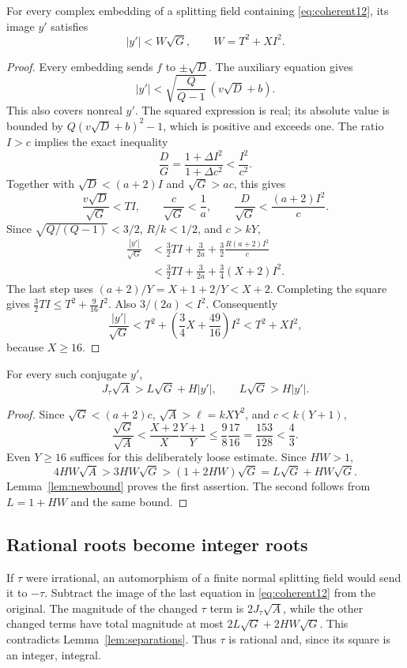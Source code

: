 \begin{lemma}
\label{lem:newbound}
For every complex embedding of a splitting field containing
\eqref{eq:coherent12}, its image $y'$ satisfies
\[
 |y'|<W\sqrt G,\qquad W=T^2+XI^2.
\]
\end{lemma}
\begin{proof}
Every embedding sends $f$ to $\pm\sqrt D$. The auxiliary equation gives
\[
 |y'|<\sqrt{\frac{Q}{Q-1}}\,(v\sqrt D+b).
\]
This also covers nonreal $y'$. The squared expression is real; its absolute
value is bounded by $Q(v\sqrt D+b)^2-1$, which is positive and exceeds one.
The ratio $I>c$ implies the exact inequality
\[
 \frac DG=\frac{1+\Delta I^2}{1+\Delta c^2}<\frac{I^2}{c^2}.
\]
Together with $\sqrt D<(a+2)I$ and $\sqrt G>ac$, this gives
\[
 \frac{v\sqrt D}{\sqrt G}<TI,\qquad
 \frac c{\sqrt G}<\frac1a,\qquad
 \frac D{\sqrt G}<\frac{(a+2)I^2}{c}.
\]
Since $\sqrt{Q/(Q-1)}<3/2$, $R/k<1/2$, and $c>kY$,
\begin{align*}
 \frac{|y'|}{\sqrt G}
 &<\frac32TI+\frac3{2a}+\frac32\frac{R(a+2)I^2}{c}\\
 &<\frac32TI+\frac3{2a}+\frac34(X+2)I^2.
\end{align*}
The last step uses $(a+2)/Y=X+1+2/Y<X+2$. Completing the square gives
$\frac32TI\le T^2+\frac9{16}I^2$. Also $3/(2a)<I^2$. Consequently
\[
 \frac{|y'|}{\sqrt G}
 <T^2+\left(\frac34X+\frac{49}{16}\right)I^2
 <T^2+XI^2,
\]
because $X\ge16$.
\end{proof}

\begin{lemma}
\label{lem:separations}
For every such conjugate $y'$,
\[
 J_\tau\sqrt A>L\sqrt G+H|y'|,
 \qquad L\sqrt G>H|y'|.
\]
\end{lemma}
\begin{proof}
Since $\sqrt G<(a+2)c$, $\sqrt A>\ell=kXY^2$, and $c<k(Y+1)$,
\[
 \frac{\sqrt G}{\sqrt A}
 <\frac{X+2}{X}\frac{Y+1}{Y}
 \le\frac98\frac{17}{16}=\frac{153}{128}<\frac43.
\]
Even $Y\ge16$ suffices for this deliberately loose estimate. Since $HW>1$,
\[
 4HW\sqrt A>3HW\sqrt G>(1+2HW)\sqrt G
              =L\sqrt G+HW\sqrt G.
\]
Lemma~\ref{lem:newbound} proves the first assertion. The second follows
from $L=1+HW$ and the same bound.
\end{proof}

\subsection{Rational roots become integer roots}
If $\tau$ were irrational, an automorphism of a finite normal splitting
field would send it to $-\tau$. Subtract the image of the last equation in
\eqref{eq:coherent12} from the original. The magnitude of the changed
$\tau$ term is $2J_\tau\sqrt A$, while the other changed terms have total
magnitude at most $2L\sqrt G+2HW\sqrt G$. This contradicts
Lemma~\ref{lem:separations}. Thus $\tau$ is rational and, since its square
is an integer, integral.

